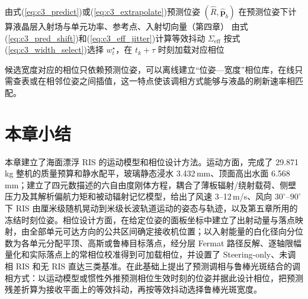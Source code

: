\begin{algorithm}[htbp]
\caption{预测调相与鲁棒光斑结合的相位更新}
\label{alg:c3_predictive}
由式(\ref{eq:c3_predict})或(\ref{eq:c3_extrapolate})预测位姿 $(\hat R,\hat{\mathbf p}_b)$\;
在预测位姿下计算液晶层入射场与单元功率、参考点、入射切向量（第四章）\;
由式(\ref{eq:c3_pred_shift})和(\ref{eq:c3_eff_jitter})计算等效抖动 $\Sigma_{\mathrm{eff}}$\;
按式(\ref{eq:c3_width_select})选择 $w_t^\star$，在 $t_k+\tau$ 时刻加载对应相位\;
\end{algorithm}

候选宽度对应的相位只依赖预测位姿，可以离线建立“位姿—宽度”相位库，在线只需查表或在相邻位姿之间插值，这一特点使该调相方式能够与液晶的刷新速率相匹配。

\section{本章小结}

本章建立了海面漂浮 RIS 的运动模型和相位设计方法。运动方面，完成了 29.871\,kg 整机的质量预算和静水配平，玻璃静态浸水 3.432\,mm、顶面高出水面 6.568\,mm；建立了四元数描述的六自由度刚体方程，耦合了薄板辐射/绕射载荷、侧壁压力及其解析偏航力矩和被动辐射记忆模型，给出了风速 3--12\,m/s、风向 $30^\circ$--$90^\circ$ 下 RIS 由厘米级随机晃动到米级长波轨道运动的姿态与轨迹，以及第五章所用的冻结时刻位姿。相位设计方面，在给定位姿的面板坐标中建立了出射动量与落点映射，由全部单元可达方向的公共区间确定接收机位置；以入射能量的白化径向分位数为各单元分配平顶、高斯或鲁棒目标落点，经分层 Fermat 路径反解、逐轴限幅量化和实际落点上的常相位校准得到可加载相位，并设置了 Steering-only、未调相 RIS 和无 RIS 直达三类基准。在此基础上提出了预测调相与鲁棒光斑结合的调相方式：以运动模型或惯性外推预测相位生效时刻的位姿并据此设计相位，把预测残差折算为接收平面上的等效抖动，再按等效抖动选择鲁棒光斑宽度。
